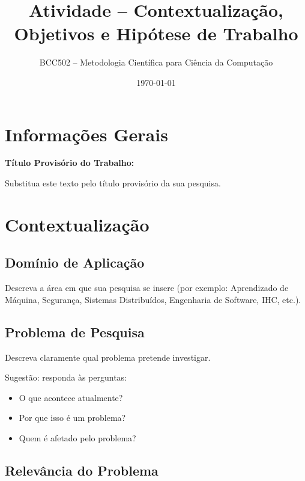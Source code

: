 \documentclass[10pt,a4paper]{extarticle}
\title{Atividade -- Contextualização, Objetivos e Hipótese de Trabalho}
\author{BCC502 -- Metodologia Científica para Ciência da Computação}
\date{\today}
\begin{document}
\maketitle

\section*{Informações Gerais}

\textbf{Título Provisório do Trabalho:}

\vspace{0.5cm}

\begin{respbox}
Substitua este texto pelo título provisório da sua pesquisa.
\end{respbox}


\section{Contextualização}

\subsection{Domínio de Aplicação}

\begin{respbox}
Descreva a área em que sua pesquisa se insere (por exemplo:
Aprendizado de Máquina, Segurança, Sistemas Distribuídos,
Engenharia de Software, IHC, etc.).
\end{respbox}


\subsection{Problema de Pesquisa}

\begin{respbox}
Descreva claramente qual problema pretende investigar.

Sugestão: responda às perguntas:

\begin{itemize}
    \item O que acontece atualmente?
    \item Por que isso é um problema?
    \item Quem é afetado pelo problema?
\end{itemize}

\end{respbox}


\subsection{Relevância do Problema}
\end{document}
